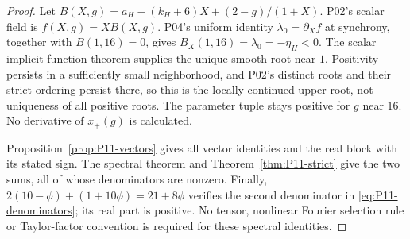 \begin{proof}
Let $B(X,g)=a_H-(k_H+6)X+(2-g)/(1+X)$.
P02's scalar field is $f(X,g)=XB(X,g)$. P04's uniform identity
$\lambda_0=\partial_X f$ at synchrony, together with $B(1,16)=0$,
gives $B_X(1,16)=\lambda_0=-\eta_H<0$.
The scalar implicit-function theorem supplies the unique smooth root
near $1$. Positivity persists in a sufficiently small neighborhood,
and P02's distinct roots and their strict ordering persist there, so
this is the locally continued upper root, not uniqueness of all positive
roots. The parameter tuple stays positive for $g$ near $16$.
No derivative of $x_+(g)$ is calculated.

Proposition~\ref{prop:P11-vectors} gives all vector identities and
the real block with its stated sign. The spectral theorem and
Theorem~\ref{thm:P11-strict} give the two sums, all of whose denominators
are nonzero. Finally,
$2(10-\phi)+(1+10\phi)=21+8\phi$ verifies the second denominator
in \eqref{eq:P11-denominators}; its real part is positive.
No tensor, nonlinear Fourier selection rule or Taylor-factor convention
is required for these spectral identities.
\end{proof}

